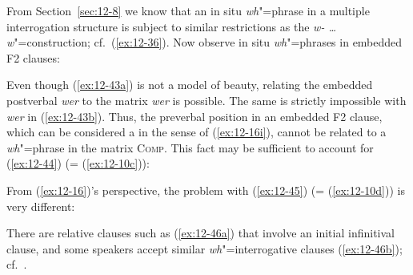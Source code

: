 \documentclass[output=paper]{langsci/langscibook}
\begin{document}
From Section~\ref{sec:12-8} we know that an in situ \emph{wh}"=phrase in a multiple interrogation
structure is subject to similar restrictions as the \textit{w- \ldots{}  w}"=construction;
cf.\ (\ref{ex:12-36}). Now observe in situ \emph{wh}"=phrases in embedded F2 clauses:
\begin{exe}
\ex
\label{ex:12-43}
\begin{xlist}
\end{xlist}
\end{exe}
\addlines
Even though (\ref{ex:12-43a}) is not a model of beauty, relating the embedded
postverbal \textit{wer} to the matrix \textit{wer} is possible. The same is
strictly impossible with  \textit{wer} in (\ref{ex:12-43b}). Thus, the preverbal position
in an embedded F2 clause, which can be considered a  in
the sense of (\ref{ex:12-16i}), cannot be related to a \emph{wh}"=phrase in the
matrix \textsc{Comp}. This fact may be sufficient to account for (\ref{ex:12-44}) (=
(\ref{ex:12-10c})):
\begin{exe}
\end{exe}
From (\ref{ex:12-16})'s perspective, the problem with (\ref{ex:12-45}) (= (\ref{ex:12-10d})) is very different:
\begin{exe}
\end{exe}
There are relative clauses such as (\ref{ex:12-46a}) that involve an initial
infinitival clause, and some speakers accept similar \emph{wh}"=interrogative clauses (\ref{ex:12-46b}); cf.\ \citet{Trissler1991}.
\end{document}
